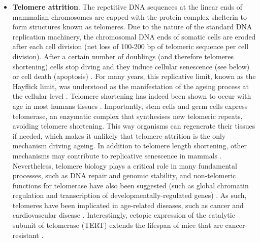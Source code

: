\begin{itemize}
	\item \textbf{Telomere attrition}. The repetitive DNA sequences at the linear ends of mammalian chromosomes are capped with the protein complex shelterin to form structures known as telomeres. Due to the nature of the standard DNA replication machinery, the chromosomal DNA ends of somatic cells are eroded after each cell division (net loss of 100-200 bp of telomeric sequence per cell division). After a certain number of doublings (and therefore telomeres shortening) cells stop diving and they induce cellular senescence (see below) or cell death (apoptosis) \cite{OSullivan2010}. For many years, this replicative limit, known as the Hayflick limit, was understood as the manifestation of the ageing process at the cellular level \cite{Hayflick1961,Hayflick1998}. Telomere shortening has indeed been shown to occur with age in most humans tissues \cite{Blasco2007}. Importantly, stem cells and germ cells express telomerase, an enzymatic complex that synthesises new telomeric repeats, avoiding telomere shortening. This way organisms can regenerate their tissues if needed, which makes it unlikely that telomere attrition is the only mechanism driving ageing. In addition to telomere length shortening, other mechanisms may contribute to replicative senescence in mammals \cite{OSullivan2010}. Nevertheless, telomere biology plays a critical role in many fundamental processes, such as DNA repair and genomic stability, and non-telomeric functions for telomerase have also been suggested (such as global chromatin regulation and transcription of developmentally-regulated genes) \cite{OSullivan2010}. As such, telomeres have been implicated in age-related diseases, such as cancer and cardiovascular disease \cite{OSullivan2010,Blasco2007}. Interestingly, ectopic expression of the catalytic subunit of telomerase (TERT) extends the lifespan of mice that are cancer-resistant \cite{Tomas-Loba2008}. 
	

\end{itemize}
